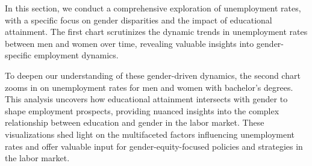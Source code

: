 \documentclass[
]{article}
\begin{document}
In this section, we conduct a comprehensive exploration of unemployment
rates, with a specific focus on gender disparities and the impact of
educational attainment. The first chart scrutinizes the dynamic trends
in unemployment rates between men and women over time, revealing
valuable insights into gender-specific employment dynamics.

To deepen our understanding of these gender-driven dynamics, the second
chart zooms in on unemployment rates for men and women with bachelor's
degrees. This analysis uncovers how educational attainment intersects
with gender to shape employment prospects, providing nuanced insights
into the complex relationship between education and gender in the labor
market. These visualizations shed light on the multifaceted factors
influencing unemployment rates and offer valuable input for
gender-equity-focused policies and strategies in the labor market.
\end{document}
